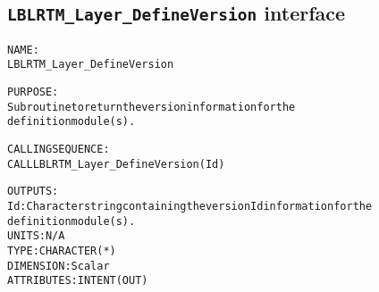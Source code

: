 \subsection{\texttt{LBLRTM\_Layer\_DefineVersion} interface}
  \label{sec:LBLRTM_Layer_DefineVersion_interface}
  \begin{alltt}
 
  NAME:
        LBLRTM_Layer_DefineVersion
 
  PURPOSE:
        Subroutine to return the version information for the
        definition module(s).
 
  CALLING SEQUENCE:
        CALL LBLRTM_Layer_DefineVersion( Id )
 
  OUTPUTS:
        Id:     Character string containing the version Id information for the
                definition module(s).
                UNITS:      N/A
                TYPE:       CHARACTER(*)
                DIMENSION:  Scalar
                ATTRIBUTES: INTENT(OUT)
 
  \end{alltt}
